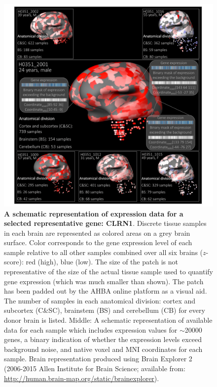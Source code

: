 \documentclass[10pt,A4]{article}
\begin{document}
\begin{figure}[h!]
  \centering
    \includegraphics[width=1\textwidth]{Ch4Fig1.pdf}
\caption{\textbf{A schematic representation of expression data for a selected representative gene: CLRN1}. Discrete tissue samples in each brain are represented as colored areas on a grey brain surface. Color corresponds to the gene expression level of each sample relative to all other samples combined over all six brains ($z$-score): red (high), blue (low). The size of the patch is not representative of the size of the actual tissue sample used to quantify gene expression (which was much smaller than shown). The patch has been padded out by the AHBA online platform as a visual aid. The number of samples in each anatomical division: cortex and subcortex (C\&SC), brainstem (BS) and cerebellum (CB) for every donor brain is listed. Middle: A schematic representation of available data for each sample which includes expression values for $\sim$\num{20000} genes, a binary indication of whether the expression levels exceed background noise, and native voxel and MNI coordinates for each sample. Brain representation produced using Brain Explorer 2 (2006-2015 Allen Institute for Brain Science; available from: \url{http://human.brain-map.org/static/brainexplorer}). }

\label{fig:Ch4Fig1}
\end{figure}
\end{document}
